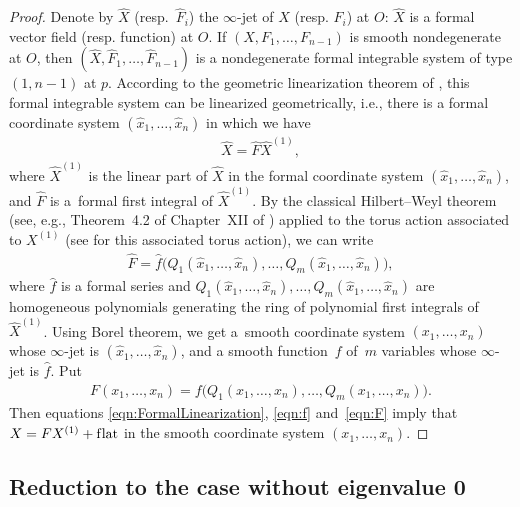 \documentclass[11pt]{article}
\numberwithin{equation}{section}
\begin{document}
\begin{proof}
Denote by $\hat{X}$ (resp.~$\hat F_i$) the $\infty$-jet of $X$ (resp. $F_i$) at $O$: $\hat{X}$ is a formal vector f\/ield (resp. function)
at $O$. If $(X,F_1,\dots,F_{n-1})$ is smooth nondegenerate at $O$, then
$(\hat{X},\hat{F}_1,\dots,\hat{F}_{n-1})$ is a nondegenerate formal integrable system of type $(1,n-1)$ at $p$.
According to the geometric linearization theorem of \cite{Zung-Nondegenerate2015},
this formal integrable system can be linearized geometrically, i.e., there is a formal coordinate system
$(\hat x_1,\dots, \hat x_n)$ in which we have
\begin{gather} \label{eqn:FormalLinearization}
\hat X = \hat F \hat X^{(1)},
\end{gather}
 where $\hat X^{(1)}$ is the linear part of $\hat X$ in the formal coordinate system
$(\hat x_1,\dots, \hat x_n)$, and $\hat F$ is a~formal f\/irst integral of $\hat X^{(1)}$.
By the classical Hilbert--Weyl theorem (see, e.g., Theorem~4.2 of Chapter~XII of \cite{GSS-Bifurcation1988})
applied to the torus action associated to $X^{(1)}$ (see \cite{Zung-Poincare2002,Zung-Nondegenerate2015} for this associated torus action), we can write
\begin{gather} \label{eqn:f}
 \hat F = \hat f \big(Q_1(\hat x_1,\dots, \hat x_n),\dots, Q_m(\hat x_1,\dots, \hat x_n)\big),
\end{gather}
where $\hat f$ is a formal series and
$Q_1(\hat x_1,\dots, \hat x_n),\dots, Q_m(\hat x_1,\dots, \hat x_n)$ are homogeneous polynomials
generating the ring of polynomial f\/irst integrals of $\hat X^{(1)}$.
Using Borel theorem, we get a~smooth coordinate system $(x_1,\dots,x_n)$ whose $\infty$-jet is
$(\hat x_1,\dots, \hat x_n)$, and a smooth function~$f$ of~$m$ variables whose $\infty$-jet is $\hat f$. Put
\begin{gather} \label{eqn:F}
F (x_1,\dots,x_n) = f\big(Q_1(x_1,\dots,x_n),\dots,Q_m(x_1,\dots,x_n)\big).
\end{gather}
Then equations \eqref{eqn:FormalLinearization}, \eqref{eqn:f} and~\eqref{eqn:F} imply that $X = FX^{(1)} + \text{f\/lat}$
in the smooth coordinate system $(x_1,\dots,x_n)$.
\end{proof}

\subsection{Reduction to the case without eigenvalue 0}\label{subsection:ReductionToParametrizedCase}
\end{document}
